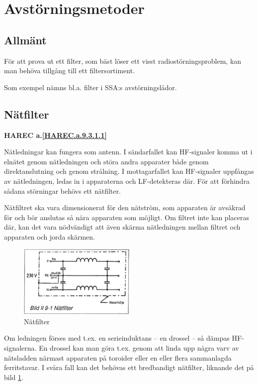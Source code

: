\section{Avstörningsmetoder}

\subsection{Allmänt}
För att prova ut ett filter, som bäst löser ett visst radiostörningsproblem,
kan man behöva tillgång till ett filtersortiment.

Som exempel nämns bl.a. filter i SSA:s avstörningslådor.

\subsection{Nätfilter}
\textbf{
HAREC a.\ref{HAREC.a.9.3.1.1}\label{myHAREC.a.9.3.1.1}
}

Nätledningar kan fungera som antenn. I sändarfallet kan HF-signaler komma ut i
elnätet genom nätledningen och störa andra apparater både genom direktanslutning
och genom strålning. I mottagarfallet kan HF-signaler uppfångas av nätledningen,
ledas in i apparaterna och LF-detekteras där. För att förhindra sådana
störningar behövs ett nätfilter.

Nätfiltret ska vara dimensionerat för den nätström, som apparaten är avsäkrad
för och bör anslutas så nära apparaten som möjligt. Om filtret inte kan placeras
där, kan det vara nödvändigt att även skärma nätledningen mellan filtret och
apparaten och jorda skärmen.

\begin{figure}
  \includegraphics[width=0.5\textwidth]{images/bild_2_9-01}
  \caption{Nätfilter}
  \label{fig:bildII9-1}
\end{figure}

Om ledningen förses med t.ex. en serieinduktans -- en drossel -- så dämpas
HF-signalerna. En drossel kan man göra t.ex. genom att linda upp några varv av
nätsladden närmast apparaten på toroider eller en eller flera sammanlagda
ferritstavar. I svåra fall kan det behövas ett bredbandigt nätfilter, liknande
det på bild \ref{fig:bildII9-1}.

